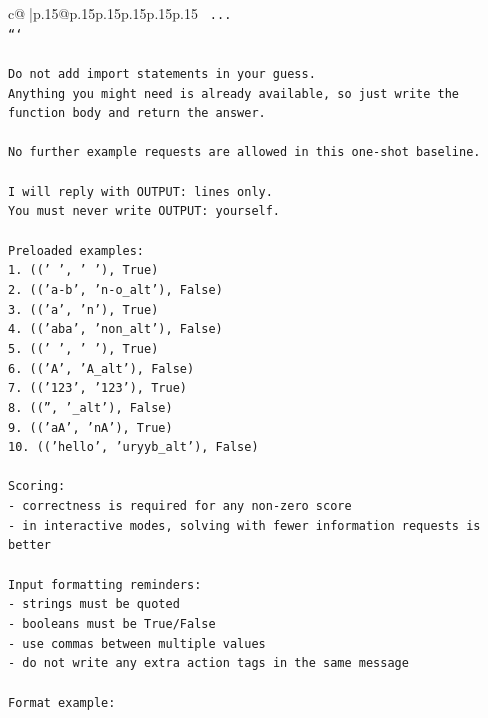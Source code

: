 \documentclass{article}
\begin{document}
{\begin{supertabular}{c@{$\;$}|p{.15\linewidth}@{}p{.15\linewidth}p{.15\linewidth}p{.15\linewidth}p{.15\linewidth}p{.15\linewidth}}
{{{\texttt{    ...} \\
\texttt{```} \\
\\ 
\texttt{Do not add import statements in your guess.} \\
\texttt{Anything you might need is already available, so just write the function body and return the answer.} \\
\\ 
\texttt{No further example requests are allowed in this one{-}shot baseline.} \\
\\ 
\texttt{I will reply with OUTPUT: lines only.} \\
\texttt{You must never write OUTPUT: yourself.} \\
\\ 
\texttt{Preloaded examples:} \\
\texttt{1. (('   ', '   '), True)} \\
\texttt{2. (('a{-}b', 'n{-}o\_alt'), False)} \\
\texttt{3. (('a', 'n'), True)} \\
\texttt{4. (('aba', 'non\_alt'), False)} \\
\texttt{5. ((' ', ' '), True)} \\
\texttt{6. (('A', 'A\_alt'), False)} \\
\texttt{7. (('123', '123'), True)} \\
\texttt{8. (('', '\_alt'), False)} \\
\texttt{9. (('aA', 'nA'), True)} \\
\texttt{10. (('hello', 'uryyb\_alt'), False)} \\
\\ 
\texttt{Scoring:} \\
\texttt{{-} correctness is required for any non{-}zero score} \\
\texttt{{-} in interactive modes, solving with fewer information requests is better} \\
\\ 
\texttt{Input formatting reminders:} \\
\texttt{{-} strings must be quoted} \\
\texttt{{-} booleans must be True/False} \\
\texttt{{-} use commas between multiple values} \\
\texttt{{-} do not write any extra action tags in the same message} \\
\\ 
\texttt{Format example:} \\
}}}
\end{supertabular}}
\end{document}
